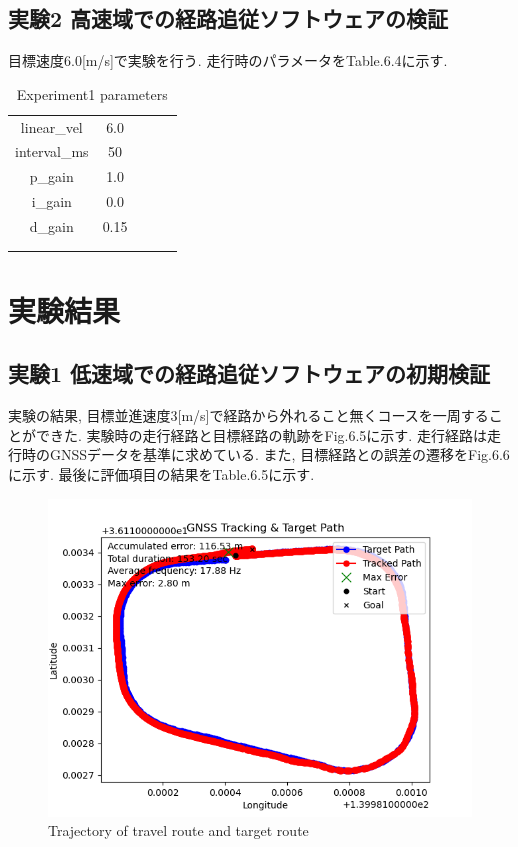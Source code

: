 \subsection{実験2  高速域での経路追従ソフトウェアの検証}
目標速度6.0[m/s]で実験を行う.
走行時のパラメータをTable.6.4に示す.

\begin{table}[H]
     \centering
     \caption{Experiment1 parameters}
     \begin{tabular}{cclll}
     \multicolumn{1}{c|}{linear\_vel}     & 6.0  &  &  &  \\
     \multicolumn{1}{c|}{interval\_ms}    & 50   &  &  &  \\
     \multicolumn{1}{c|}{p\_gain}          & 1.0  &  &  &  \\
     \multicolumn{1}{c|}{i\_gain}          & 0.0  &  &  &  \\
     \multicolumn{1}{c|}{d\_gain}          & 0.15 &  &  &  \\
     \multicolumn{1}{l}{}                 &      &  &  &  \\
     \multicolumn{1}{l}{}                 &      &  &  & 
     \end{tabular}
\end{table}

\newpage

\section{実験結果}

\subsection{実験1   低速域での経路追従ソフトウェアの初期検証}
実験の結果, 目標並進速度3[m/s]で経路から外れること無くコースを一周することができた.
実験時の走行経路と目標経路の軌跡をFig.6.5に示す.
走行経路は走行時のGNSSデータを基準に求めている.
また, 目標経路との誤差の遷移をFig.6.6に示す.
最後に評価項目の結果をTable.6.5に示す.

\begin{figure}[H]
     \centering
    \includegraphics[keepaspectratio, scale=0.55]
         {images/3msIAE.png}
    \caption{Trajectory of travel route and target route}
    \label{fig:path}
\end{figure}

